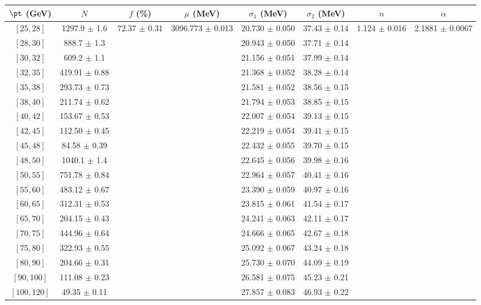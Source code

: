 \begin{tabular}{c||c|c|c|c|c|c|c}
$\pt$ (GeV) & $N$ & $f$ (\%) & $\mu$ (MeV) & $\sigma_1$ (MeV) & $\sigma_2$ (MeV) & $n$ & $\alpha$ \\
\hline
$[25, 28]$ & 1297.9 $\pm$ 1.6 & \multirow{19}{*}{72.37 $\pm$ 0.31} & \multirow{19}{*}{3096.773 $\pm$ 0.013} & 20.730 $\pm$ 0.050 & 37.43 $\pm$ 0.14 & \multirow{19}{*}{1.124 $\pm$ 0.016} & \multirow{19}{*}{2.1881 $\pm$ 0.0067}\\
$[28, 30]$ & 888.7 $\pm$ 1.3 &  &  & 20.943 $\pm$ 0.050 & 37.71 $\pm$ 0.14 &  & \\
$[30, 32]$ & 609.2 $\pm$ 1.1 &  &  & 21.156 $\pm$ 0.051 & 37.99 $\pm$ 0.14 &  & \\
$[32, 35]$ & 419.91 $\pm$ 0.88 &  &  & 21.368 $\pm$ 0.052 & 38.28 $\pm$ 0.14 &  & \\
$[35, 38]$ & 293.73 $\pm$ 0.73 &  &  & 21.581 $\pm$ 0.052 & 38.56 $\pm$ 0.15 &  & \\
$[38, 40]$ & 211.74 $\pm$ 0.62 &  &  & 21.794 $\pm$ 0.053 & 38.85 $\pm$ 0.15 &  & \\
$[40, 42]$ & 153.67 $\pm$ 0.53 &  &  & 22.007 $\pm$ 0.054 & 39.13 $\pm$ 0.15 &  & \\
$[42, 45]$ & 112.50 $\pm$ 0.45 &  &  & 22.219 $\pm$ 0.054 & 39.41 $\pm$ 0.15 &  & \\
$[45, 48]$ & 84.58 $\pm$ 0.39 &  &  & 22.432 $\pm$ 0.055 & 39.70 $\pm$ 0.15 &  & \\
$[48, 50]$ & 1040.1 $\pm$ 1.4 &  &  & 22.645 $\pm$ 0.056 & 39.98 $\pm$ 0.16 &  & \\
$[50, 55]$ & 751.78 $\pm$ 0.84 &  &  & 22.964 $\pm$ 0.057 & 40.41 $\pm$ 0.16 &  & \\
$[55, 60]$ & 483.12 $\pm$ 0.67 &  &  & 23.390 $\pm$ 0.059 & 40.97 $\pm$ 0.16 &  & \\
$[60, 65]$ & 312.31 $\pm$ 0.53 &  &  & 23.815 $\pm$ 0.061 & 41.54 $\pm$ 0.17 &  & \\
$[65, 70]$ & 204.15 $\pm$ 0.43 &  &  & 24.241 $\pm$ 0.063 & 42.11 $\pm$ 0.17 &  & \\
$[70, 75]$ & 444.96 $\pm$ 0.64 &  &  & 24.666 $\pm$ 0.065 & 42.67 $\pm$ 0.18 &  & \\
$[75, 80]$ & 322.93 $\pm$ 0.55 &  &  & 25.092 $\pm$ 0.067 & 43.24 $\pm$ 0.18 &  & \\
$[80, 90]$ & 204.66 $\pm$ 0.31 &  &  & 25.730 $\pm$ 0.070 & 44.09 $\pm$ 0.19 &  & \\
$[90, 100]$ & 111.08 $\pm$ 0.23 &  &  & 26.581 $\pm$ 0.075 & 45.23 $\pm$ 0.21 &  & \\
$[100, 120]$ & 49.35 $\pm$ 0.11 &  &  & 27.857 $\pm$ 0.083 & 46.93 $\pm$ 0.22 &  & \\
\end{tabular}
